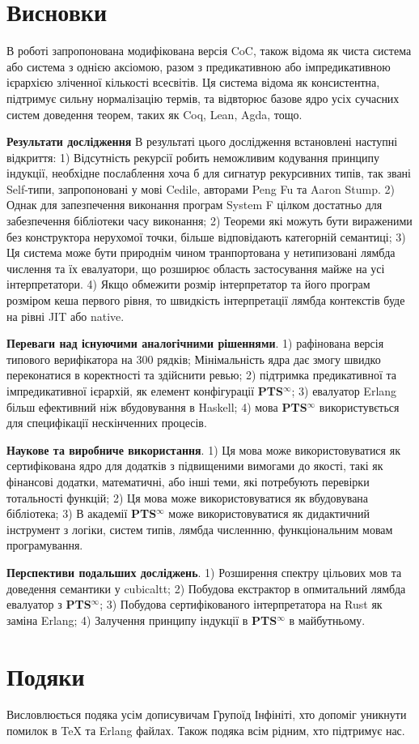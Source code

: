 \documentclass{article}
\begin{document}
\section{Висновки}
В роботі запропонована модифікована версія CoC, також відома як чиста система або система з однією аксіомою, разом
з предикативною або імпредикативною ієрархією зліченної кількості всесвітів. Ця система відома як консистентна,
підтримує сильну нормалізацію термів, та відвторює базове ядро усіх сучасних систем доведення теорем, таких як Coq, Lean, Agda, тощо.

{\bf Результати дослідження}
В результаті цього дослідження встановлені наступні відкриття:
1) Відсутність рекурсії робить неможливим кодування принципу індукції, необхідне послаблення хоча б для сигнатур
   рекурсивних типів, так звані Self-типи, запропоновані у мові Cedile, авторами Peng Fu та Aaron Stump\cite{Fu14}.
2) Однак для запезпечення виконання програм System F цілком достатньо для забезпечення бібліотеки часу виконання;
2) Теореми які можуть бути вираженими без конструктора нерухомої точки, більше відповідають категорній семантиці;
3) Ця система може бути природнім чином транпортована у нетипизовані лямбда числення та їх евалуатори, що розширює
   область застосування майже на усі інтерпретатори.
4) Якщо обмежити розмір інтерпретатор та його програм розміром кеша первого рівня,
   то швидкість інтерпретації лямбда контекстів буде на рівні JIT або native.

{\bf Переваги над існуючими аналогічними рішеннями}.
1) рафінована версія типового верифікатора на 300 рядків; Мінімальність ядра дає змогу швидко переконатися в коректності та здійснити ревью;
2) підтримка предикативної та імпредикативної ієрархій, як елемент конфігурації {\bf PTS$^\infty$};
3) евалуатор Erlang більш ефективний ніж вбудовування в Haskell;
4) мова {\bf PTS$^\infty$} використувється для специфікації нескінченних процесів.

{\bf Наукове та виробниче використання}.
1) Ця мова може використовуватися як сертифікована ядро для додатків з підвищеними вимогами до якості,
такі як фінансові додатки, математичні, або інші теми, які потребують перевірки тотальності функцій;
2) Ця мова може використовуватися як вбудовувана бібліотека;
3) В академії {\bf PTS$^\infty$} може використовуватися як дидактичний інструмент з логіки, систем типів, лямбда численнню, функціональним мовам програмування.

{\bf Перспективи подальших досліджень}.
1) Розширення спектру цільових мов та доведення семантики у cubicaltt;
2) Побудова екстрактор в опмитальний лямбда евалуатор з {\bf PTS$^\infty$};
3) Побудова сертифікованого інтерпретатора на Rust як заміна Erlang;
4) Залучення принципу індукції в {\bf PTS$^\infty$} в майбутньому.

\section{Подяки}
Висловлюється подяка усім дописувичам Групоїд Інфініті, хто допоміг уникнути помилок в TeX та Erlang файлах.
Також подяка всім рідним, хто підтримує нас.



\end{document}
